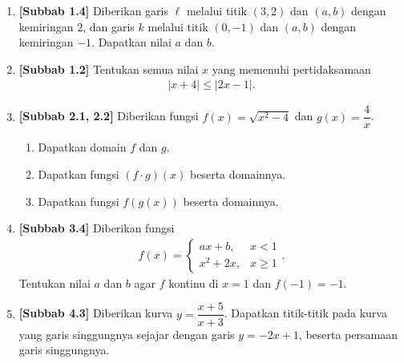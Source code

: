 \documentclass[10pt,openany,a4paper]{article}
\theoremstyle{definition}
\theoremstyle{definition}
\theoremstyle{plain}
\begin{document}
\newpage

\begin{enumerate}
    \item \textbf{[Subbab 1.4]} Diberikan garis $\ell$ melalui titik $(3,2)$ dan $(a,b)$ dengan kemiringan $2$, dan garis $k$ melalui titik $(0,-1)$ dan $(a,b)$ dengan kemiringan $-1$. Dapatkan nilai $a$ dan $b$.

    \item \textbf{[Subbab 1.2]} Tentukan semua nilai $x$ yang memenuhi pertidaksamaan
    \begin{align*}
        |x+4|\leq|2x-1|.
    \end{align*}

    \item \textbf{[Subbab 2.1, 2.2]} Diberikan fungsi $f(x)=\sqrt{x^2-4}$ dan $g(x)=\dfrac{4}{x}$.
    \begin{enumerate}
        \item Dapatkan domain $f$ dan $g$.
        \item Dapatkan fungsi $(f\cdot g)(x)$ beserta domainnya.
        \item Dapatkan fungsi $f(g(x))$ beserta domainnya.
    \end{enumerate}

    \item \textbf{[Subbab 3.4]} Diberikan fungsi
    \begin{align*}
        f(x)=\begin{cases}
            ax+b, & x<1\\
            x^2+2x, & x\geq 1
        \end{cases}.
    \end{align*}
    Tentukan nilai $a$ dan $b$ agar $f$ kontinu di $x=1$ dan $f(-1)=-1$.

    \item \textbf{[Subbab 4.3]} Diberikan kurva $y=\dfrac{x+5}{x+3}$. Dapatkan titik-titik pada kurva yang garis singgungnya sejajar dengan garis $y=-2x+1$, beserta persamaan garis singgungnya.
\end{enumerate}

\newpage
\end{document}
